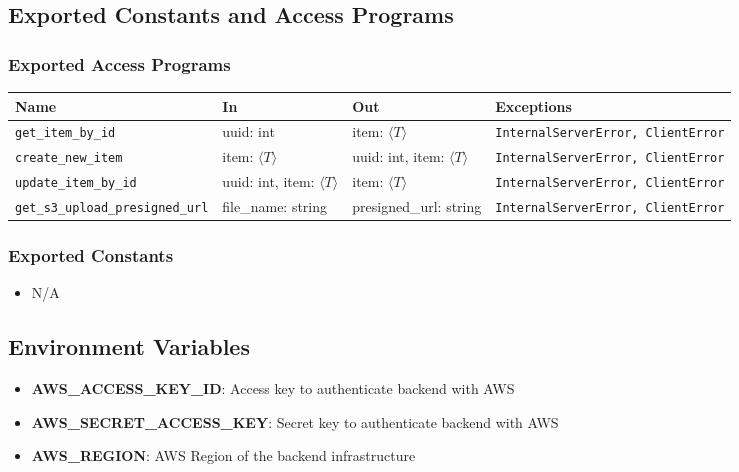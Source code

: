 \documentclass[12pt, titlepage]{article}
\begin{document}
\subsection{Exported Constants and Access Programs}
\subsubsection{Exported Access Programs}
\begin{center}
  \renewcommand{\arraystretch}{1.2}
  \begin{tabularx}{\textwidth}{|l|X|X|p{4.5cm}|}
    \hline
    \textbf{Name} & \textbf{In} & \textbf{Out} & \textbf{Exceptions} \\
    \hline 
    \texttt{get\_item\_by\_id} & uuid: int & item: $\langle T \rangle$ & \texttt{InternalServerError, ClientError} \\
    \hline
    \texttt{create\_new\_item} & item: $\langle T \rangle$ & uuid: int, item: $\langle T \rangle$ & \texttt{InternalServerError, ClientError} \\
    \hline
    \texttt{update\_item\_by\_id} & uuid: int, item: $\langle T \rangle$ & item: $\langle T \rangle$ & \texttt{InternalServerError, ClientError} \\
    \hline
    \texttt{get\_s3\_upload\_presigned\_url} & file\_name: string & presigned\_url: string & \texttt{InternalServerError, ClientError} \\
    \hline
  \end{tabularx}
\end{center}

\subsubsection{Exported Constants}
\begin{itemize}
    \item N/A
\end{itemize}

\subsection{Environment Variables}
\begin{itemize}
    \item \textbf{AWS\_ACCESS\_KEY\_ID}: Access key to authenticate backend with AWS
    \item \textbf{AWS\_SECRET\_ACCESS\_KEY}: Secret key to authenticate backend with AWS
    \item \textbf{AWS\_REGION}: AWS Region of the backend infrastructure
\end{itemize}
\end{document}
